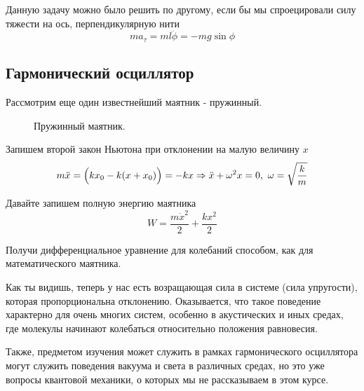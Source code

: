 Данную задачу можно было решить по другому, если бы мы спроецировали силу тяжести на ось, перпендикулярную нити
\begin{equation*}
    m a_{\tau} = m l \ddot{\phi}  = - mg\sin \phi
\end{equation*}

\subsection{Гармонический осциллятор}
Рассмотрим еще один известнейший маятник - пружинный. 

\begin{figure}[h!]
    \caption{Пружинный маятник.}
\end{figure}

Запишем второй закон Ньютона при отклонении на малую величину $x$
\begin{equation*}
    m\ddot{x} = \Bigl(kx_0 - k(x + x_0) \Bigr) = - kx \Rightarrow \ddot{x} + \omega^2 x = 0,\ \omega = \sqrt{\frac{k}{m}}
\end{equation*}

Давайте запишем полную энергию маятника
\begin{equation*}
    W = \frac{m \dot{x}^2}{2} + \frac{kx^2}{2}
\end{equation*}
\begin{prac}
    Получи дифференциальное уравнение для колебаний способом, как для математического маятника.
\end{prac}
Как ты видишь, теперь у нас есть возращающая сила в системе (сила упругости), которая пропорциональна отклонению. Оказывается, что такое поведение характерно для очень многих систем, особенно в акустических и иных средах, где молекулы начинают колебаться относительно положения равновесия.

Также, предметом изучения может служить в рамках гармонического осциллятора могут служить поведения вакуума и света в различных средах, но это уже вопросы квантовой механики, о которых мы не рассказываем в этом курсе.
